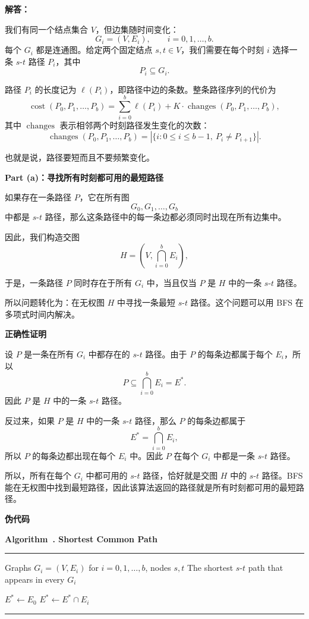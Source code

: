 \documentclass[12pt,a4paper]{article}
\newenvironment{breakablealgorithm}[1]{%
  \par\addvspace{1em}
  \refstepcounter{algorithm}%
  \noindent\textbf{Algorithm~\thealgorithm. #1}\par\nobreak
  \noindent\rule{\linewidth}{0.4pt}\par\nobreak
  \vspace{0.4em}
}{%
  \par\vspace{0.2em}
  \noindent\rule{\linewidth}{0.4pt}
  \par\addvspace{1em}
}
\begin{document}
\begin{answerbox}
\textbf{解答：}

我们有同一个结点集合 $V$，但边集随时间变化：
\[
G_i=(V,E_i),\qquad i=0,1,\ldots,b.
\]
每个 $G_i$ 都是连通图。给定两个固定结点 $s,t\in V$，我们需要在每个时刻 $i$ 选择一条 $s$-$t$ 路径 $P_i$，其中
\[
P_i \subseteq G_i.
\]

路径 $P_i$ 的长度记为 $\ell(P_i)$，即路径中边的条数。整条路径序列的代价为
\[
\operatorname{cost}(P_0,P_1,\ldots,P_b)
=
\sum_{i=0}^{b}\ell(P_i)
+
K\cdot \operatorname{changes}(P_0,P_1,\ldots,P_b),
\]
其中 $\operatorname{changes}$ 表示相邻两个时刻路径发生变化的次数：
\[
\operatorname{changes}(P_0,P_1,\ldots,P_b)
=
\left|\{i:0\le i\le b-1,\ P_i\neq P_{i+1}\}\right|.
\]


也就是说，路径要短而且不要频繁变化。

\textbf{Part (a)：寻找所有时刻都可用的最短路径}


如果存在一条路径 $P$，它在所有图
\[
G_0,G_1,\ldots,G_b
\]
中都是 $s$-$t$ 路径，那么这条路径中的每一条边都必须同时出现在所有边集中。

因此，我们构造交图
\[
H=\left(V,\bigcap_{i=0}^{b}E_i\right),
\]

于是，一条路径 $P$ 同时存在于所有 $G_i$ 中，当且仅当 $P$ 是 $H$ 中的一条 $s$-$t$ 路径。

所以问题转化为：在无权图 $H$ 中寻找一条最短 $s$-$t$ 路径。这个问题可以用 BFS 在多项式时间内解决。

\textbf{正确性证明}

设 $P$ 是一条在所有 $G_i$ 中都存在的 $s$-$t$ 路径。由于 $P$ 的每条边都属于每个 $E_i$，所以
\[
P\subseteq \bigcap_{i=0}^{b}E_i=E^*.
\]
因此 $P$ 是 $H$ 中的一条 $s$-$t$ 路径。

反过来，如果 $P$ 是 $H$ 中的一条 $s$-$t$ 路径，那么 $P$ 的每条边都属于
\[
E^*=\bigcap_{i=0}^{b}E_i,
\]
所以 $P$ 的每条边都出现在每个 $E_i$ 中。因此 $P$ 在每个 $G_i$ 中都是一条 $s$-$t$ 路径。

所以，所有在每个 $G_i$ 中都可用的 $s$-$t$ 路径，恰好就是交图 $H$ 中的 $s$-$t$ 路径。BFS 能在无权图中找到最短路径，因此该算法返回的路径就是所有时刻都可用的最短路径。

\textbf{伪代码}

\begin{breakablealgorithm}{Shortest Common Path}
\begin{algorithmic}[1]
\Require Graphs $G_i=(V,E_i)$ for $i=0,1,\ldots,b$, nodes $s,t$
\Ensure The shortest $s$-$t$ path that appears in every $G_i$

\State $E^*\gets E_0$
    \State $E^*\gets E^*\cap E_i$
\EndFor


\end{algorithmic}
\end{breakablealgorithm}
\end{answerbox}
\end{document}
